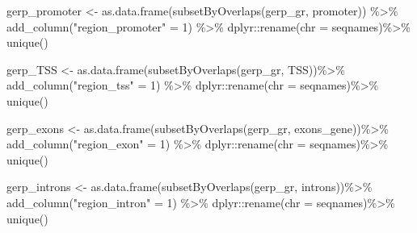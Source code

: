 \documentclass[
  letterpaper,
  DIV=11,
  numbers=noendperiod]{scrreprt}
\newenvironment{Shaded}{}{}
\newcommand{\AttributeTok}[1]{\textcolor[rgb]{0.84,0.23,0.29}{#1}}
\newcommand{\DecValTok}[1]{\textcolor[rgb]{0.00,0.36,0.77}{#1}}
\newcommand{\FunctionTok}[1]{\textcolor[rgb]{0.44,0.26,0.76}{#1}}
\newcommand{\NormalTok}[1]{\textcolor[rgb]{0.14,0.16,0.18}{#1}}
\newcommand{\OtherTok}[1]{\textcolor[rgb]{0.44,0.26,0.76}{#1}}
\newcommand{\SpecialCharTok}[1]{\textcolor[rgb]{0.00,0.36,0.77}{#1}}
\newcommand{\StringTok}[1]{\textcolor[rgb]{0.01,0.18,0.38}{#1}}
\begin{document}
\begin{Shaded}
\begin{Highlighting}[]
\NormalTok{gerp\_promoter }\OtherTok{\textless{}{-}} \FunctionTok{as.data.frame}\NormalTok{(}\FunctionTok{subsetByOverlaps}\NormalTok{(gerp\_gr, promoter)) }\SpecialCharTok{\%\textgreater{}\%}
  \FunctionTok{add\_column}\NormalTok{(}\StringTok{"region\_promoter"} \OtherTok{=} \DecValTok{1}\NormalTok{) }\SpecialCharTok{\%\textgreater{}\%}\NormalTok{ dplyr}\SpecialCharTok{::}\FunctionTok{rename}\NormalTok{(}\AttributeTok{chr =}\NormalTok{ seqnames)}\SpecialCharTok{\%\textgreater{}\%} \FunctionTok{unique}\NormalTok{()}

\NormalTok{gerp\_TSS }\OtherTok{\textless{}{-}} \FunctionTok{as.data.frame}\NormalTok{(}\FunctionTok{subsetByOverlaps}\NormalTok{(gerp\_gr, TSS))}\SpecialCharTok{\%\textgreater{}\%}
  \FunctionTok{add\_column}\NormalTok{(}\StringTok{"region\_tss"} \OtherTok{=} \DecValTok{1}\NormalTok{) }\SpecialCharTok{\%\textgreater{}\%}\NormalTok{ dplyr}\SpecialCharTok{::}\FunctionTok{rename}\NormalTok{(}\AttributeTok{chr =}\NormalTok{ seqnames)}\SpecialCharTok{\%\textgreater{}\%} \FunctionTok{unique}\NormalTok{()}

\NormalTok{gerp\_exons }\OtherTok{\textless{}{-}} \FunctionTok{as.data.frame}\NormalTok{(}\FunctionTok{subsetByOverlaps}\NormalTok{(gerp\_gr, exons\_gene))}\SpecialCharTok{\%\textgreater{}\%}
  \FunctionTok{add\_column}\NormalTok{(}\StringTok{"region\_exon"} \OtherTok{=} \DecValTok{1}\NormalTok{) }\SpecialCharTok{\%\textgreater{}\%}\NormalTok{ dplyr}\SpecialCharTok{::}\FunctionTok{rename}\NormalTok{(}\AttributeTok{chr =}\NormalTok{ seqnames)}\SpecialCharTok{\%\textgreater{}\%} \FunctionTok{unique}\NormalTok{()}

\NormalTok{gerp\_introns }\OtherTok{\textless{}{-}} \FunctionTok{as.data.frame}\NormalTok{(}\FunctionTok{subsetByOverlaps}\NormalTok{(gerp\_gr, introns))}\SpecialCharTok{\%\textgreater{}\%}
  \FunctionTok{add\_column}\NormalTok{(}\StringTok{"region\_intron"} \OtherTok{=} \DecValTok{1}\NormalTok{) }\SpecialCharTok{\%\textgreater{}\%}\NormalTok{ dplyr}\SpecialCharTok{::}\FunctionTok{rename}\NormalTok{(}\AttributeTok{chr =}\NormalTok{ seqnames)}\SpecialCharTok{\%\textgreater{}\%} \FunctionTok{unique}\NormalTok{()}


\end{Highlighting}
\end{Shaded}
\end{document}
